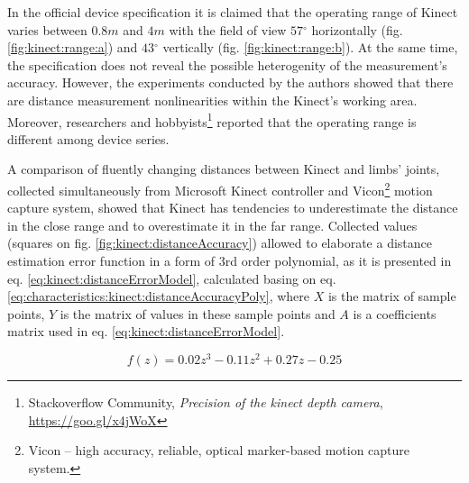 \documentclass[sensors,article,submit,moreauthors,pdftex,10pt,a4paper]{mdpi}
\newcommand{\degree}{\ensuremath{{}^{\circ}}\xspace}
\begin{document}
In the official device specification it is claimed that the operating range of Kinect varies between $0.8m$ and $4m$ with the field of view $57\degree$ horizontally (fig. \ref{fig:kinect:range:a}) and $43\degree$ vertically (fig. \ref{fig:kinect:range:b}). At the same time, the specification does not reveal the possible heterogenity of the measurement's accuracy. However, the experiments conducted by the authors showed that there are distance measurement nonlinearities within the Kinect’s working area. Moreover, researchers \cite{DiFilippo2015} and hobbyists\footnote{Stackoverflow Community, \textit{Precision of the kinect depth camera}, \url{https://goo.gl/x4jWoX}} reported that the operating range is different among device series.  

A comparison of fluently changing distances between Kinect and limbs' joints, collected simultaneously from Microsoft Kinect controller and Vicon\footnote{Vicon -- high accuracy, reliable, optical marker-based motion capture system.} motion capture system, showed that Kinect has tendencies to underestimate the distance in the close range and to overestimate it in the far range. Collected values (squares on fig. \ref{fig:kinect:distanceAccuracy}) allowed to elaborate a distance estimation error function in a form of 3rd order polynomial, as it is presented in eq. \ref{eq:kinect:distanceErrorModel}, calculated basing on eq. \ref{eq:characteristics:kinect:distanceAccuracyPoly}, where $X$ is the matrix of sample points, $Y$ is the matrix of values in these sample points and $A$ is a coefficients matrix used in eq. \ref{eq:kinect:distanceErrorModel}. 

\begin{equation}
	f(z)=0.02z^3-0.11z^2+0.27z-0.25 
	\label{eq:kinect:distanceErrorModel}
\end{equation}
\end{document}
